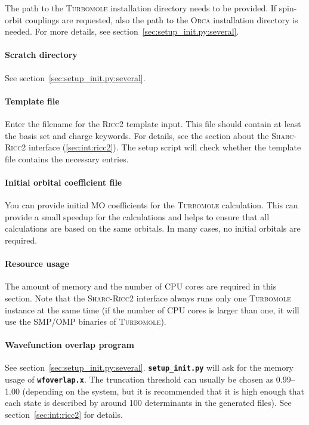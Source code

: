 \documentclass[a4paper,10pt,DIV=15,openany]{scrbook}
\newcommand{\sharc}{\textsc{Sharc}}
\newcommand{\ttt}[1]{\textbf{\texttt{#1}}}
\begin{document}
The path to the \textsc{Turbomole} installation directory needs to be provided.
If spin-orbit couplings are requested, also the path to the \textsc{Orca} installation directory is needed.
For more details, see section~\ref{sec:setup_init.py:several}.

\paragraph{Scratch directory}

See section~\ref{sec:setup_init.py:several}.

\paragraph{Template file}

Enter the filename for the \textsc{Ricc2} template input. This file should contain at least the basis set and charge keywords. For details, see the section about the \sharc-\textsc{Ricc2} interface (\ref{sec:int:ricc2}). The setup script will check whether the template file contains the necessary entries. 

\paragraph{Initial orbital coefficient file}

You can provide initial MO coefficients for the \textsc{Turbomole} calculation. This can provide a small speedup for the calculations and helps to ensure that all calculations are based on the same orbitals.
In many cases, no initial orbitals are required.

\paragraph{Resource usage}

The amount of memory and the number of CPU cores are required in this section.
Note that the \sharc-\textsc{Ricc2} interface always runs only one \textsc{Turbomole} instance at the same time (if the number of CPU cores is larger than one, it will use the SMP/OMP binaries of \textsc{Turbomole}).

\paragraph{Wavefunction overlap program}

See section~\ref{sec:setup_init.py:several}. \ttt{setup\_init.py} will ask for the memory usage of \ttt{wfoverlap.x}. The truncation threshold can usually be chosen as 0.99--1.00 (depending on the system, but it is recommended that it is high enough that each state is described by around 100 determinants in the generated files). See section~\ref{sec:int:ricc2} for details.
\end{document}

